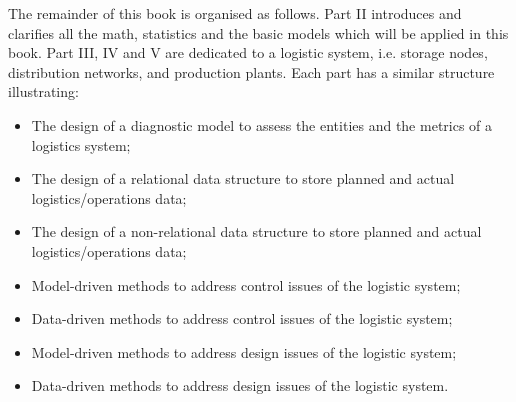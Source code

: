 The remainder of this book  is organised as follows. Part II introduces and clarifies all the math, statistics and the basic models which will be applied in this book. Part III, IV and V are dedicated to a logistic system, i.e. storage nodes, distribution networks, and production plants. Each part has a similar structure illustrating:
\begin{itemize}
    \item The design of a diagnostic model to assess the entities and the metrics of a logistics system;
    \item The design of a relational data structure to store planned and actual logistics/operations data;
    \item The design of a non-relational data structure to store planned and actual logistics/operations data;
    \item Model-driven methods to address control issues of the logistic system;
    \item Data-driven methods to address control issues of the logistic system;
    \item Model-driven methods to address design issues of the logistic system;
    \item Data-driven methods to address design issues of the logistic system.
\end{itemize}






%
%